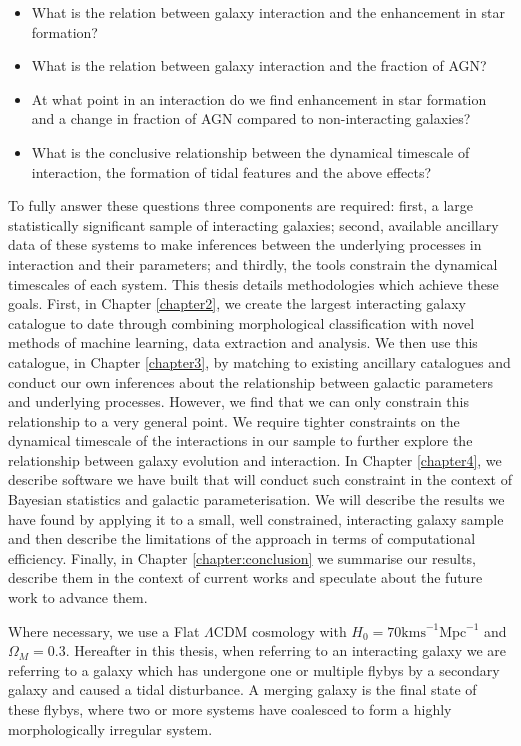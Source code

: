\begin{itemize}
\item What is the relation between galaxy interaction and the enhancement in star formation?
\item What is the relation between galaxy interaction and the fraction of AGN?
\item At what point in an interaction do we find enhancement in star formation and a change in fraction of AGN compared to non-interacting galaxies?
\item What is the conclusive relationship between the dynamical timescale of interaction, the formation of tidal features and the above effects?
\end{itemize}

To fully answer these questions three components are required: first, a large statistically significant sample of interacting galaxies; second, available ancillary data of these systems to make inferences between the underlying processes in interaction and their parameters; and thirdly, the tools constrain the dynamical timescales of each system. This thesis details methodologies which achieve these goals. First, in Chapter \ref{chapter2}, we create the largest interacting galaxy catalogue to date through combining morphological classification with novel methods of machine learning, data extraction and analysis. We then use this catalogue, in Chapter \ref{chapter3}, by matching to existing ancillary catalogues and conduct our own inferences about the relationship between galactic parameters and underlying processes. However, we find that we can only constrain this relationship to a very general point. We require tighter constraints on the dynamical timescale of the interactions in our sample to further explore the relationship between galaxy evolution and interaction. In Chapter \ref{chapter4}, we describe software we have built that will conduct such constraint in the context of Bayesian statistics and galactic parameterisation. We will describe the results we have found by applying it to a small, well constrained, interacting galaxy sample and then describe the limitations of the approach in terms of computational efficiency. Finally, in Chapter \ref{chapter:conclusion} we summarise our results, describe them in the context of current works and speculate about the future work to advance them.

Where necessary, we use a Flat $\Lambda$CDM cosmology with $H_{0} = 70\mathrm{kms}^{-1}\mathrm{Mpc}^{-1}$ and $\Omega_{M} = 0.3$. Hereafter in this thesis, when referring to an interacting galaxy we are referring to a galaxy which has undergone one or multiple flybys by a secondary galaxy and caused a tidal disturbance. A merging galaxy is the final state of these flybys, where two or more systems have coalesced to form a highly morphologically irregular system.
